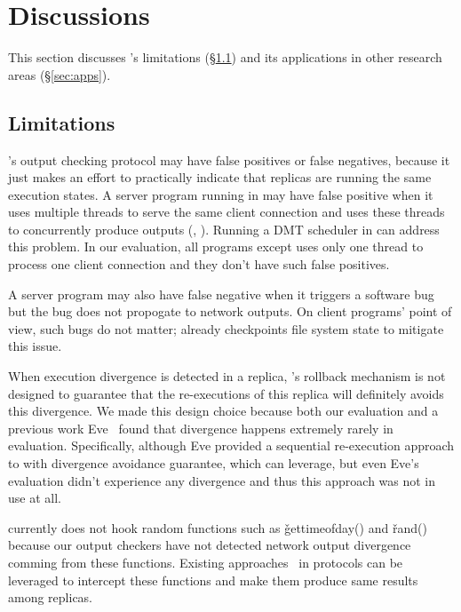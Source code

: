 \section{Discussions}\label{sec:discuss}

This section discusses \xxx's limitations (\S\ref{sec:limits}) and its 
applications in other research areas (\S\ref{sec:apps}).

\subsection{Limitations}\label{sec:limits}

\xxx's output checking protocol may have false positives or false negatives, 
because it just makes an effort to practically indicate that replicas are 
running the same execution states. A server program running in \xxx may have 
false positive when it uses multiple threads to serve the same client 
connection and uses these threads to concurrently produce outputs 
(\eg, \clamav). Running a DMT scheduler in \xxx can address this problem. In 
our evaluation, all programs except \clamav uses only one thread to process one 
client connection and they don't have such false positives.

A server program may also have false negative when it triggers a software bug 
but the bug does not propogate to network outputs. On client programs' point of 
view, such bugs do not matter; \xxx already checkpoints file system state to 
mitigate this issue.

When execution divergence is detected in a replica, \xxx's rollback mechanism 
is not designed to guarantee that the re-executions of this replica will 
definitely avoids this divergence. We made this design choice because both 
our evaluation and a previous work Eve~\cite{eve:osdi12} found that divergence 
happens extremely rarely in evaluation. Specifically, although Eve provided a 
sequential re-execution approach to with divergence avoidance guarantee, which 
\xxx can leverage, but even Eve's evaluation didn't experience any divergence 
and thus this approach was not in use at all.

\xxx currently does not hook random functions such as \v{gettimeofday()} and 
\v{rand()} because our output checkers have not detected network output 
divergence comming from these functions. Existing 
approaches~\cite{eve:osdi12,paxos:practical} in \paxos protocols can be 
leveraged to intercept these functions and make them produce same results among 
replicas.

